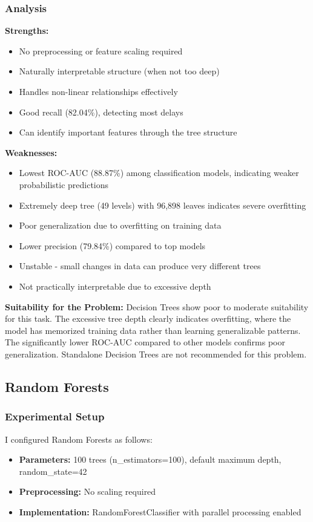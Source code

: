\documentclass[sigconf]{acmart}
\begin{document}
\subsubsection{Analysis}
\textbf{Strengths:}
\begin{itemize}
    \item No preprocessing or feature scaling required
    \item Naturally interpretable structure (when not too deep)
    \item Handles non-linear relationships effectively
    \item Good recall (82.04\%), detecting most delays
    \item Can identify important features through the tree structure
\end{itemize}

\textbf{Weaknesses:}
\begin{itemize}
    \item Lowest ROC-AUC (88.87\%) among classification models, indicating weaker probabilistic predictions
    \item Extremely deep tree (49 levels) with 96,898 leaves indicates severe overfitting
    \item Poor generalization due to overfitting on training data
    \item Lower precision (79.84\%) compared to top models
    \item Unstable - small changes in data can produce very different trees
    \item Not practically interpretable due to excessive depth
\end{itemize}

\textbf{Suitability for the Problem:} Decision Trees show poor to moderate suitability for this task. The excessive tree depth clearly indicates overfitting, where the model has memorized training data rather than learning generalizable patterns. The significantly lower ROC-AUC compared to other models confirms poor generalization. Standalone Decision Trees are not recommended for this problem.

\subsection{Random Forests}

\subsubsection{Experimental Setup}
I configured Random Forests as follows:
\begin{itemize}
    \item \textbf{Parameters:} 100 trees (n\_estimators=100), default maximum depth, random\_state=42
    \item \textbf{Preprocessing:} No scaling required
    \item \textbf{Implementation:} RandomForestClassifier with parallel processing enabled
\end{itemize}
\end{document}
